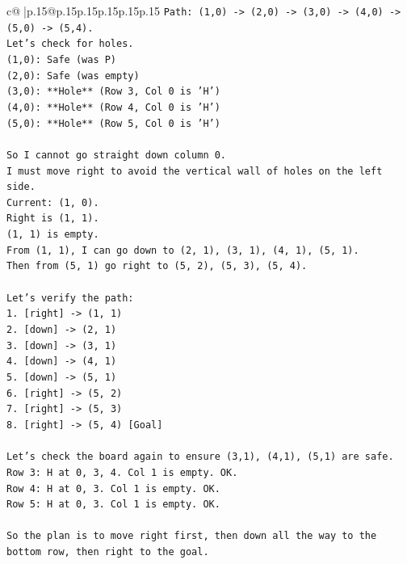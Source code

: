 \documentclass{article}
\begin{document}
{\begin{supertabular}{c@{$\;$}|p{.15\linewidth}@{}p{.15\linewidth}p{.15\linewidth}p{.15\linewidth}p{.15\linewidth}p{.15\linewidth}}
{{{\texttt{Path: (1,0) {-}> (2,0) {-}> (3,0) {-}> (4,0) {-}> (5,0) {-}> (5,4).} \\
\texttt{Let's check for holes.} \\
\texttt{(1,0): Safe (was P)} \\
\texttt{(2,0): Safe (was empty)} \\
\texttt{(3,0): **Hole** (Row 3, Col 0 is 'H')} \\
\texttt{(4,0): **Hole** (Row 4, Col 0 is 'H')} \\
\texttt{(5,0): **Hole** (Row 5, Col 0 is 'H')} \\
\\ 
\texttt{So I cannot go straight down column 0.} \\
\texttt{I must move right to avoid the vertical wall of holes on the left side.} \\
\texttt{Current: (1, 0).} \\
\texttt{Right is (1, 1).} \\
\texttt{(1, 1) is empty.} \\
\texttt{From (1, 1), I can go down to (2, 1), (3, 1), (4, 1), (5, 1).} \\
\texttt{Then from (5, 1) go right to (5, 2), (5, 3), (5, 4).} \\
\\ 
\texttt{Let's verify the path:} \\
\texttt{1. {[}right{]} {-}> (1, 1)} \\
\texttt{2. {[}down{]} {-}> (2, 1)} \\
\texttt{3. {[}down{]} {-}> (3, 1)} \\
\texttt{4. {[}down{]} {-}> (4, 1)} \\
\texttt{5. {[}down{]} {-}> (5, 1)} \\
\texttt{6. {[}right{]} {-}> (5, 2)} \\
\texttt{7. {[}right{]} {-}> (5, 3)} \\
\texttt{8. {[}right{]} {-}> (5, 4) {[}Goal{]}} \\
\\ 
\texttt{Let's check the board again to ensure (3,1), (4,1), (5,1) are safe.} \\
\texttt{Row 3: H at 0, 3, 4. Col 1 is empty. OK.} \\
\texttt{Row 4: H at 0, 3. Col 1 is empty. OK.} \\
\texttt{Row 5: H at 0, 3. Col 1 is empty. OK.} \\
\\ 
\texttt{So the plan is to move right first, then down all the way to the bottom row, then right to the goal.} \\
}}}
\end{supertabular}}
\end{document}
